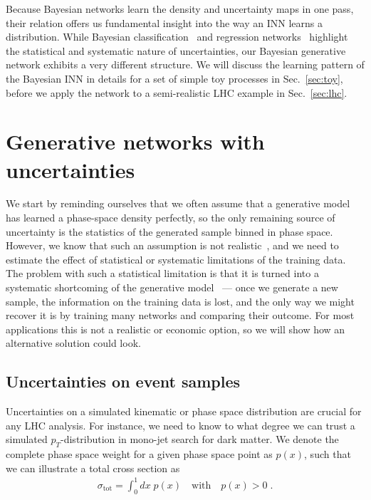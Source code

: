 Because Bayesian networks learn the density and uncertainty maps in
one pass, their relation offers us fundamental insight into the way an
INN learns a distribution. While Bayesian
classification~\cite{Bollweg:2019skg} and regression
networks~\cite{Kasieczka:2020vlh} highlight the statistical and
systematic nature of uncertainties, our Bayesian generative network
exhibits a very different structure. We will discuss the learning
pattern of the Bayesian INN in details for a set of simple toy
processes in Sec.~\ref{sec:toy}, before we apply the network to a
semi-realistic LHC example in Sec.~\ref{sec:lhc}.

\section{Generative networks with uncertainties}
\label{sec:nets}

We start by reminding ourselves that we often assume that a generative
model has learned a phase-space density perfectly, so the only
remaining source of uncertainty is the statistics of the generated
sample binned in phase space.  However, we know that such an
assumption is not realistic~\cite{Bollweg:2019skg,Kasieczka:2020vlh},
and we need to estimate the effect of statistical or systematic
limitations of the training data. The problem with such a statistical
limitation is that it is turned into a systematic shortcoming of the
generative model~\cite{gan_phasespace} --- once we generate a new
sample, the information on the training data is lost, and the only way
we might recover it is by training many networks and comparing their
outcome. For most applications this is not a realistic or economic
option, so we will show how an alternative solution could look.

\subsection{Uncertainties on event samples}
\label{sec:nets_unc}

Uncertainties on a simulated kinematic or phase space distribution are
crucial for any LHC analysis. For instance, we need to know to what
degree we can trust a simulated $p_T$-distribution in mono-jet search
for dark matter. We denote the complete phase space weight for a given
phase space point as $p(x)$, such that we can illustrate a total cross
section as
%
\begin{align}
  \sigma_\text{tot} = \int_0^1 dx \; p(x)
  \quad \text{with} \quad p(x)>0 \; .
\end{align}
%

